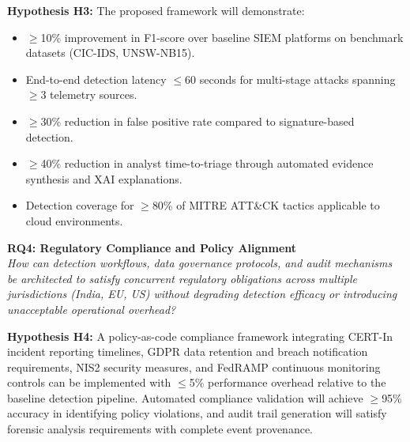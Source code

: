 \textbf{Hypothesis H3:} The proposed framework will demonstrate:
\begin{itemize}
    \item $\geq$10\% improvement in F1-score over baseline SIEM platforms on benchmark datasets (CIC-IDS, UNSW-NB15).
    \item End-to-end detection latency $\leq$60 seconds for multi-stage attacks spanning $\geq$3 telemetry sources.
    \item $\geq$30\% reduction in false positive rate compared to signature-based detection.
    \item $\geq$40\% reduction in analyst time-to-triage through automated evidence synthesis and XAI explanations.
    \item Detection coverage for $\geq$80\% of MITRE ATT\&CK tactics applicable to cloud environments.
\end{itemize}

\textbf{RQ4: Regulatory Compliance and Policy Alignment} \\
\emph{How can detection workflows, data governance protocols, and audit mechanisms be architected to satisfy concurrent regulatory obligations across multiple jurisdictions (India, EU, US) without degrading detection efficacy or introducing unacceptable operational overhead?}

\textbf{Hypothesis H4:} A policy-as-code compliance framework integrating CERT-In incident reporting timelines, GDPR data retention and breach notification requirements, NIS2 security measures, and FedRAMP continuous monitoring controls can be implemented with $\leq$5\% performance overhead relative to the baseline detection pipeline. Automated compliance validation will achieve $\geq$95\% accuracy in identifying policy violations, and audit trail generation will satisfy forensic analysis requirements with complete event provenance.

